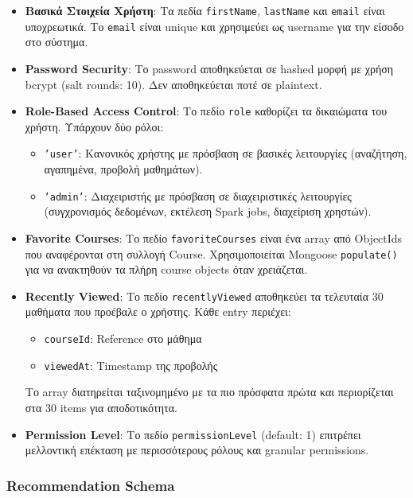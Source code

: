 \documentclass[a4paper,12pt]{article}
\begin{document}
\begin{itemize}
    \item \textbf{Βασικά Στοιχεία Χρήστη}: Τα πεδία \texttt{firstName}, \texttt{lastName} και \texttt{email} είναι υποχρεωτικά. Το \texttt{email} είναι unique και χρησιμεύει ως username για την είσοδο στο σύστημα.
    
    \item \textbf{Password Security}: Το password αποθηκεύεται σε hashed μορφή με χρήση bcrypt (salt rounds: 10). Δεν αποθηκεύεται ποτέ σε plaintext.
    
    \item \textbf{Role-Based Access Control}: Το πεδίο \texttt{role} καθορίζει τα δικαιώματα του χρήστη. Υπάρχουν δύο ρόλοι:
    \begin{itemize}
        \item \texttt{'user'}: Κανονικός χρήστης με πρόσβαση σε βασικές λειτουργίες (αναζήτηση, αγαπημένα, προβολή μαθημάτων).
        \item \texttt{'admin'}: Διαχειριστής με πρόσβαση σε διαχειριστικές λειτουργίες (συγχρονισμός δεδομένων, εκτέλεση Spark jobs, διαχείριση χρηστών).
    \end{itemize}
    
    \item \textbf{Favorite Courses}: Το πεδίο \texttt{favoriteCourses} είναι ένα array από ObjectIds που αναφέρονται στη συλλογή Course. Χρησιμοποιείται Mongoose \texttt{populate()} για να ανακτηθούν τα πλήρη course objects όταν χρειάζεται.
    
    \item \textbf{Recently Viewed}: Το πεδίο \texttt{recentlyViewed} αποθηκεύει τα τελευταία 30 μαθήματα που προέβαλε ο χρήστης. Κάθε entry περιέχει:
    \begin{itemize}
        \item \texttt{courseId}: Reference στο μάθημα
        \item \texttt{viewedAt}: Timestamp της προβολής
    \end{itemize}
    Το array διατηρείται ταξινομημένο με τα πιο πρόσφατα πρώτα και περιορίζεται στα 30 items για αποδοτικότητα.
    
    \item \textbf{Permission Level}: Το πεδίο \texttt{permissionLevel} (default: 1) επιτρέπει μελλοντική επέκταση με περισσότερους ρόλους και granular permissions.
\end{itemize}

\subsubsection{Recommendation Schema}
\end{document}
